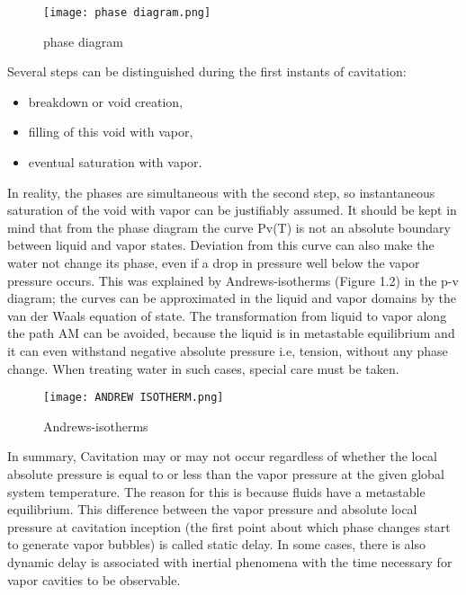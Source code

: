 \begin{figure}[H]
    \centering
    \texttt{[image: phase diagram.png]}
    \caption{phase diagram\cite{FundamentalsofCavitation.2004}}
    \label{fig:fig1}
\end{figure}

 
Several steps can be distinguished during the first instants of
cavitation:

\begin{itemize}
  \item breakdown or void creation,
  \item filling of this void with vapor,
  \item eventual saturation with vapor.
\end {itemize}

In reality, the phases are simultaneous with the second step, so
instantaneous saturation of the void with vapor can be justifiably
assumed. It should be kept in mind that from the phase diagram the
curve Pv(T) is not an absolute boundary between liquid and vapor
states. Deviation from this curve can also make the water not change
its phase, even if a drop in pressure well below the vapor pressure
occurs. This was explained by Andrews-isotherms (Figure 1.2) in the
p-v diagram; the curves can be approximated in the liquid and vapor
domains by the van der Waals equation of state. The transformation
from liquid to vapor along the path AM can be avoided, because the
liquid is in metastable equilibrium and it can even withstand negative
absolute pressure i.e, tension, without any phase change. When treating water in such cases, special care must be taken.\\

\begin{figure}[H]
    \centering
    \texttt{[image: ANDREW ISOTHERM.png]}
    \caption{Andrews-isotherms\cite{FundamentalsofCavitation.2004}}
    \label{fig:fig2}
\end{figure}

In summary, Cavitation may or may not occur regardless of whether the
local absolute pressure is equal to or less than the vapor pressure at 
the given global system temperature. The reason for this is because 
fluids have a metastable equilibrium. This difference between the vapor pressure and
absolute local pressure at cavitation inception (the first point about
which phase changes start to generate vapor bubbles) is called static
delay. In some cases, there is also dynamic delay is associated with
inertial phenomena with the time necessary for vapor cavities to be
observable.\\

